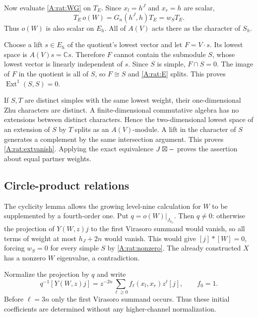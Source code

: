 \documentclass[11pt]{article}
\newcommand{\C}{\mathbb C}\newcommand{\Q}{\mathbb Q}\newcommand{\Z}{\mathbb Z}
\newcommand{\Ext}{\operatorname{Ext}}\newcommand{\wt}{\operatorname{wt}}
\numberwithin{equation}{section}
\begin{document}
Now evaluate \eqref{A:rat:WG} on $T_E$. Since $x_l=h^J$ and $x_r=h$ are scalar,
\[
 T_E\,o(W)=G_n(h^J,h)T_E=w_ST_E.
\]
Thus $o(W)$ is also scalar on $E_h$. All of $A(V)$ acts there as the character of $S_h$.

Choose a lift $s\in E_h$ of the quotient's lowest vector and let $F=V\cdot s$. Its lowest space is $A(V)s=\C s$. Therefore $F$ cannot contain the submodule $S$, whose lowest vector is linearly independent of $s$. Since $S$ is simple, $F\cap S=0$. The image of $F$ in the quotient is all of $S$, so $F\cong S$ and \eqref{A:rat:E} splits. This proves $\Ext^1(S,S)=0$.

If $S,T$ are distinct simples with the same lowest weight, their one-dimensional Zhu characters are distinct. A finite-dimensional commutative algebra has no extensions between distinct characters. Hence the two-dimensional lowest space of an extension of $S$ by $T$ splits as an $A(V)$-module. A lift in the character of $S$ generates a complement by the same intersection argument. This proves \eqref{A:rat:extvanish}. Applying the exact equivalence $J\boxtimes-$ proves the assertion about equal partner weights.

\subsection{Circle-product relations}
The cyclicity lemma allows the growing level-nine calculation for $W$ to be supplemented by a fourth-order one. Put $q=o(W)|_{J_{h_J}}$. Then $q\ne0$: otherwise the projection of $Y(W,z)j$ to the first Virasoro summand would vanish, so all terms of weight at most $h_J+2n$ would vanish. This would give $[j]*[W]=0$, forcing $w_S=0$ for every simple $S$ by \eqref{A:rat:nonzero}. The already constructed $X$ has a nonzero $W$ eigenvalue, a contradiction.

Normalize the projection by $q$ and write
\begin{equation}\label{A:rat:Fseries}
 q^{-1}[Y(W,z)j]=z^{-2n}\sum_{\ell\geq0}f_\ell(x_l,x_r)z^\ell[j],
 \qquad f_0=1.
\end{equation}
Before $\ell=3n$ only the first Virasoro summand occurs. Thus these initial coefficients are determined without any higher-channel normalization.
\end{document}
